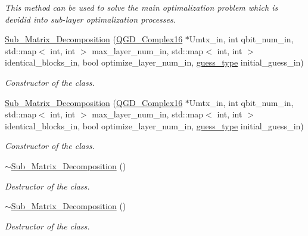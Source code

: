 \begin{DoxyCompactItemize}
\begin{DoxyCompactList}\small\item\em This method can be used to solve the main optimalization problem which is devidid into sub-\/layer optimalization processes. \end{DoxyCompactList}\item 
\hyperlink{class_sub___matrix___decomposition_a1a487473112b2f92e3cd47fd9fa4e2c9}{Sub\+\_\+\+Matrix\+\_\+\+Decomposition} (\hyperlink{struct_q_g_d___complex16}{Q\+G\+D\+\_\+\+Complex16} $\ast$Umtx\+\_\+in, int qbit\+\_\+num\+\_\+in, std\+::map$<$ int, int $>$ max\+\_\+layer\+\_\+num\+\_\+in, std\+::map$<$ int, int $>$ identical\+\_\+blocks\+\_\+in, bool optimize\+\_\+layer\+\_\+num\+\_\+in, \hyperlink{decomposition_2include_2_decomposition___base_8h_a0e76cf2e4eb5edbf067ba5014ffa2134}{guess\+\_\+type} initial\+\_\+guess\+\_\+in)
\begin{DoxyCompactList}\small\item\em Constructor of the class. \end{DoxyCompactList}\item 
\hyperlink{class_sub___matrix___decomposition_a1a487473112b2f92e3cd47fd9fa4e2c9}{Sub\+\_\+\+Matrix\+\_\+\+Decomposition} (\hyperlink{struct_q_g_d___complex16}{Q\+G\+D\+\_\+\+Complex16} $\ast$Umtx\+\_\+in, int qbit\+\_\+num\+\_\+in, std\+::map$<$ int, int $>$ max\+\_\+layer\+\_\+num\+\_\+in, std\+::map$<$ int, int $>$ identical\+\_\+blocks\+\_\+in, bool optimize\+\_\+layer\+\_\+num\+\_\+in, \hyperlink{decomposition_2include_2_decomposition___base_8h_a0e76cf2e4eb5edbf067ba5014ffa2134}{guess\+\_\+type} initial\+\_\+guess\+\_\+in)
\begin{DoxyCompactList}\small\item\em Constructor of the class. \end{DoxyCompactList}\item 
\hyperlink{class_sub___matrix___decomposition_aab0a780ee7b2a42d4031a03624be9ea8}{$\sim$\+Sub\+\_\+\+Matrix\+\_\+\+Decomposition} ()
\begin{DoxyCompactList}\small\item\em Destructor of the class. \end{DoxyCompactList}\item 
\hyperlink{class_sub___matrix___decomposition_aab0a780ee7b2a42d4031a03624be9ea8}{$\sim$\+Sub\+\_\+\+Matrix\+\_\+\+Decomposition} ()
\begin{DoxyCompactList}\small\item\em Destructor of the class. \end{DoxyCompactList}\end{DoxyCompactItemize}
